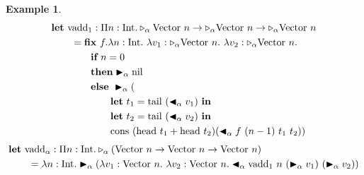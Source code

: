 \documentclass[9pt, a4paper]{extarticle}
\theoremstyle{break}
\newtheorem{ex}{Example}
\newcommand{\TW}{\triangleright}
\newcommand{\TB}{\blacktriangleright}
\newcommand{\TBL}{\blacktriangleleft}
\begin{document}
\begin{ex}
	\newcommand{\M}{\textrm{M}}
	\newcommand{\I}{\textrm{Int}}
	\newcommand{\Vn}{\text{Vector}\ n}
	\begin{align*}
		 & \textbf{let}\ \text{vadd}_1 : \Pi n:\I.\TW_\alpha\Vn\to\TW_\alpha\Vn\to\TW_\alpha\Vn               \\
		 & \hspace{7mm} = \textbf{fix}\ f.\lambda n:\I.\ \lambda v_1:\TW_\alpha\Vn.\ \lambda v_2:\TW_\alpha\Vn.   \\
		 & \hspace{14mm} \textbf{if}\ n = 0                                                                   \\
		 & \hspace{14mm} \textbf{then} \TB_\alpha \text{nil}                                                  \\
		 & \hspace{14mm} \textbf{else}\ \TB_\alpha (                                                          \\
		 & \hspace{21mm} \textbf{let}\ t_1 = \text{tail}\ (\TBL_\alpha v_1)\ \textbf{in}                      \\
		 & \hspace{21mm} \textbf{let}\ t_2 = \text{tail}\ (\TBL_\alpha v_2)\ \textbf{in}                      \\
		 & \hspace{21mm} \text{cons}\ (\text{head}\ t_1 + \text{head}\ t_2) (\TBL_\alpha f\ (n-1)\ t_1\ t_2)) \\
	\end{align*}
	\begin{align*}
		 & \textbf{let}\ \text{vadd}_\alpha : \Pi n:\I.\TW_\alpha(\Vn\to\Vn\to\Vn)              \\
		 & \hspace{7mm} = \lambda n:\I.\TB_\alpha (\lambda v_1:\Vn.\ \lambda v_2:\Vn. \TBL_\alpha \text{vadd}_1\ n\ (\TB_\alpha v_1)\ (\TB_\alpha v_2)) \\
	\end{align*}
\end{ex}
\end{document}

